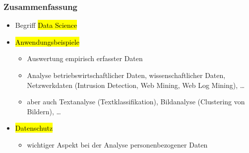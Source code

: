 
\begin{frame}
\frametitle{Zusammenfassung}

\begin{itemize}
\item Begriff \hl{Data Science}
\item \hl{Anwendungsbeispiele}
\begin{itemize}
\item Auswertung empirisch erfasster Daten
\item Analyse betriebswirtschaftlicher Daten, wissenschaftlicher
  Daten, Netzwerkdaten (Intrusion Detection, Web Mining, Web Log
  Mining), \dots
\item aber auch Textanalyse (Textklassifikation), Bildanalyse
  (Clustering von Bildern), \dots
\end{itemize}
\item \hl{Datenschutz}
\begin{itemize}
\item wichtiger Aspekt bei der Analyse personenbezogener Daten
\end{itemize}
\end{itemize}

\end{frame}


